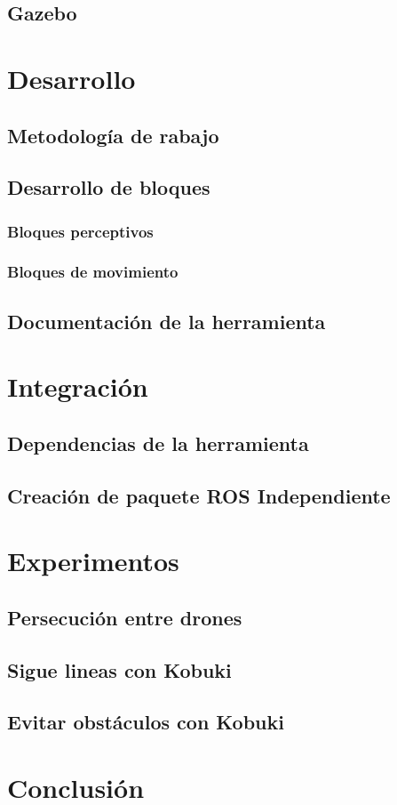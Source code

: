 \documentclass{article}
\begin{document}
    \subsection{Gazebo}
\section{Desarrollo}
    \subsection{Metodología de rabajo}
    \subsection{Desarrollo de bloques}
        \subsubsection{Bloques perceptivos}
        \subsubsection{Bloques de movimiento}
    \subsection{Documentación de la herramienta}
\section{Integración}
    \subsection{Dependencias de la herramienta}
    \subsection{Creación de paquete ROS Independiente}
\section{Experimentos}
    \subsection{Persecución entre drones}
    \subsection{Sigue lineas con Kobuki}
    \subsection{Evitar obstáculos con Kobuki}
\section{Conclusión}
\end{document}
